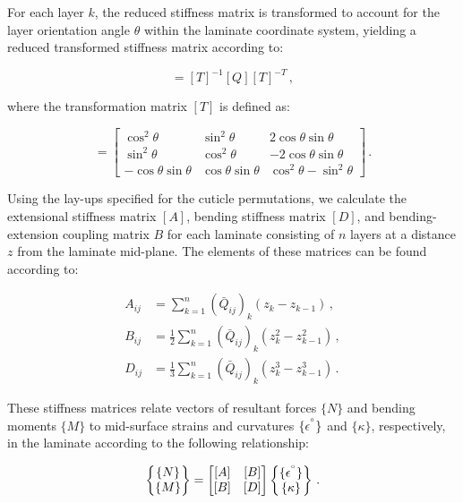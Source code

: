 \documentclass[twocolumn, linenumbers, superscriptaddress, nofootinbib]{revtex4-1}
\begin{document}
				For each layer $k$, the reduced stiffness matrix is transformed to account for the layer orientation angle $\theta$ within the laminate coordinate system, yielding a reduced transformed stiffness matrix according to:
				
				\begin{equation}
					[\bar{Q}] = [T]^{-1}[Q][T]^{-T}\,,
				\end{equation}
				
				where the transformation matrix $[T]$ is defined as:
				
				\begin{equation}
				[T] =
				 \begin{bmatrix}
					 \cos^2\theta & \sin^2\theta & 2\cos\theta\sin\theta \\
					 \sin^2\theta & \cos^2\theta & -2\cos\theta\sin\theta \\
					 -\cos\theta\sin\theta & \cos\theta\sin\theta & \cos^2\theta - \sin^2\theta
				 \end{bmatrix}\,.
				\end{equation}
				
				Using the lay-ups specified for the cuticle permutations, we calculate the extensional stiffness matrix $[A]$, bending stiffness matrix $[D]$, and bending-extension coupling matrix $B$ for each laminate consisting of $n$ layers at a distance $z$ from the laminate mid-plane.
				The elements of these matrices can be found according to:
				
				\begin{equation}
					\begin{aligned}
						A_{ij} & = \sum_{k = 1}^{n}(\bar{Q}_{ij})_k(z_{k} - z_{k-1})\,, \\
						B_{ij} & = \frac{1}{2}\sum_{k = 1}^{n}(\bar{Q}_{ij})_k(z^2_{k} - z^2_{k-1})\,, \\
						D_{ij} & = \frac{1}{3}\sum_{k = 1}^{n}(\bar{Q}_{ij})_k(z^3_{k} - z^3_{k-1})\,.
					\end{aligned}
				\end{equation}
				
				These stiffness matrices relate vectors of resultant forces $\{N\}$ and bending moments $\{M\}$ to mid-surface strains and curvatures $\{\epsilon^{\degree}\}$ and $\{\kappa\}$, respectively, in the laminate according to the following relationship:
				
				\begin{equation}
					\begin{Bmatrix}
						\{N\} \\
						\{M\}
					\end{Bmatrix}
					=
					\begin{bmatrix}
						[A] & [B] \\
						[B] & [D]
					\end{bmatrix}
					\begin{Bmatrix}
					\{\epsilon^{\degree}\} \\
					\{\kappa\}
					\end{Bmatrix}\,.
				\end{equation}
				
\end{document}
